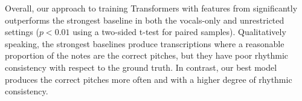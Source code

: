 Overall, our approach to training Transformers with features from \jukebox{} significantly outperforms the strongest baseline in both the vocals-only and unrestricted settings (${p < 0.01}$ using a two-sided t-test for paired samples). 
Qualitatively speaking, the strongest baselines produce transcriptions where a reasonable proportion of the notes are the correct pitches, but they have poor rhythmic consistency with respect to the ground truth. 
In contrast, our best model produces the correct pitches more often and with a higher degree of rhythmic consistency.
